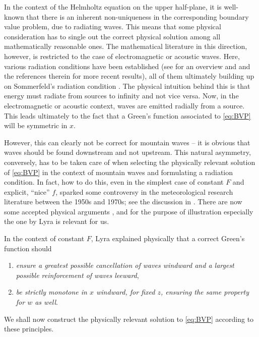 \documentclass[11pt,twoside,reqno,centertags]{amsart}
\theoremstyle{definition}
\begin{document}
In the context of the Helmholtz equation on the upper half-plane, it is well-known that there is an inherent non-uniqueness in the corresponding boundary value problem, due to radiating waves. This means that some physical consideration has to single out the correct physical solution among all mathematically reasonable ones. The mathematical literature in this direction, however, is restricted to the case of electromagnetic or acoustic waves. Here, various radiation conditions have been established (see \cite{Schot92} for an overview and \cite{BonnetEtAl09,CiraoloMagnanini09,Xu95} and the references therein for more recent results), all of them ultimately building up on Sommerfeld's radiation condition \cite{Sommerfeld1912}. The physical intuition behind this is that energy must radiate from sources to infinity and not vice versa. Now, in the electromagnetic or acoustic context, waves are emitted radially from a source. This leads ultimately to the fact that a Green's function associated to \eqref{eq:BVP} will be symmetric in $x$.

However, this can clearly not be correct for mountain waves -- it is obvious that waves should be found downstream and not upstream. This natural asymmetry, conversely, has to be taken care of when selecting the physically relevant solution of \eqref{eq:BVP} in the context of mountain waves and formulating a radiation condition. In fact, how to do this, even in the simplest case of constant $F$ and explicit, \enquote{nice} $f$, sparked some controversy in the meteorological research literature between the 1950s and 1970s; see the discussion in \cite{Smith79}. There are now some accepted physical arguments \cite{Corby54,EliassenPalm54,EliassenPalm60,Queney47}, and for the purpose of illustration especially the one by Lyra \cite{Lyra43} is relevant for us.

In the context of constant $F$, Lyra explained physically that a correct Green's function should
\begin{enumerate}[label=(L\arabic*),ref=(L\arabic*),leftmargin=*]
	\item \emph{ensure a greatest possible cancellation of waves windward and a largest possible reinforcement of waves leeward},\label{cond:L1}
	\item \emph{be strictly monotone in $x$ windward, for fixed $z$, ensuring the same property for $w$ as well}.\label{cond:L2}
\end{enumerate}
We shall now construct the physically relevant solution to \eqref{eq:BVP} according to these principles.
\end{document}

